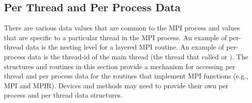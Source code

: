 \documentclass{article}
\begin{document}
\subsection{Per Thread and Per Process Data}
\label{sec:perthread}
There are various data values that are common to the MPI process and values
that are specific to a particular thread in the MPI process.  An example of
per-thread data is the nesting level for a layered MPI routine.  An example of
per-process data is the thread-id of the main thread (the thread that called
 or ).  
The structures and routines in this section provide a mechanism for
accessing per thread and per process data for the routines that
implement MPI functions (e.g., MPI and MPIR).  Devices and methods may
need to provide their own per process and per thread data structures.
\end{document}
